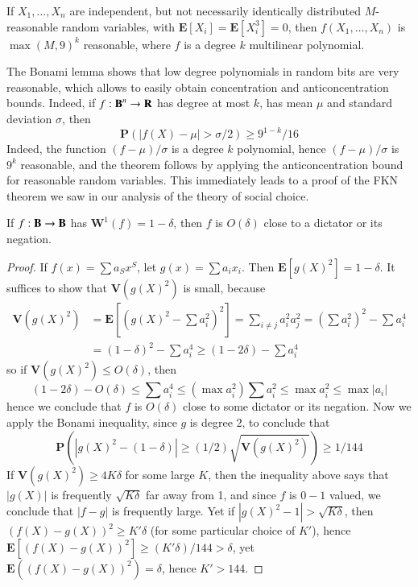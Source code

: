 \begin{corollary}
    If $X_1, \dots, X_n$ are independent, but not necessarily identically distributed $M$-reasonable random variables, with $\mathbf{E}[X_i] = \mathbf{E}[X_i^3] = 0$, then $f(X_1, \dots, X_n)$ is $\max(M,9)^k$ reasonable, where $f$ is a degree $k$ multilinear polynomial.
\end{corollary}

The Bonami lemma shows that low degree polynomials in random bits are very reasonable, which allows to easily obtain concentration and anticoncentration bounds. Indeed, if $f: \operatorname{\mathbf{B}}^n \to \mathbf{R}$ has degree at most $k$, has mean $\mu$ and standard deviation $\sigma$, then
%
\[ \mathbf{P}(|f(X) - \mu| > \sigma/2) \geq 9^{1-k}/16 \]
%
Indeed, the function $(f - \mu)/\sigma$ is a degree $k$ polynomial, hence $(f - \mu)/\sigma$ is $9^k$ reasonable, and the theorem follows by applying the anticoncentration bound for reasonable random variables. This immediately leads to a proof of the FKN theorem we saw in our analysis of the theory of social choice.

\begin{theorem}
    If $f: \operatorname{\mathbf{B}} \to \operatorname{\mathbf{B}}$ has $\mathbf{W}^1(f) = 1 - \delta$, then $f$ is $O(\delta)$ close to a dictator or its negation.
\end{theorem}
\begin{proof}
    If $f(x) = \sum a_S x^S$, let $g(x) = \sum a_i x_i$. Then $\mathbf{E}[g(X)^2] = 1 - \delta$. It suffices to show that $\mathbf{V}(g(X)^2)$ is small, because
    \begin{align*}
        \mathbf{V}(g(X)^2) &= \mathbf{E} \left[ \left(g(X)^2 - \sum a_i^2 \right)^2 \right] = \sum_{i \neq j} a_i^2 a_j^2 = \left( \sum a_i^2 \right)^2 - \sum a_i^4\\
        &= (1 - \delta)^2 - \sum a_i^4 \geq (1 - 2\delta) - \sum a_i^4
    \end{align*}
    so if $\mathbf{V}(g(X)^2) \leq O(\delta)$, then
    \[ (1 - 2\delta) - O(\delta) \leq \sum a_i^4 \leq \left( \max a_i^2 \right) \sum a_i^2 \leq \max a_i^2 \leq \max |a_i| \]
    hence we conclude that $f$ is $O(\delta)$ close to some dictator or its negation. Now we apply the Bonami inequality, since $g$ is degree 2, to conclude that
    \[ \mathbf{P} \left( |g(X)^2 - (1 - \delta)| \geq (1/2) \sqrt{\mathbf{V}(g(X)^2)} \right) \geq 1/144 \]
    If $\mathbf{V}(g(X)^2) \geq 4K \delta$ for some large $K$, then the inequality above says that $|g(X)|$ is frequently $\sqrt{K \delta}$ far away from 1, and since $f$ is $0-1$ valued, we conclude that $|f - g|$ is frequently large. Yet if $|g(X)^2 - 1| > \sqrt{K\delta}$, then $(f(X) - g(X))^2 \geq K' \delta$ (for some particular choice of $K'$), hence $\mathbf{E}[(f(X) - g(X))^2] \geq (K' \delta)/144 > \delta$, yet $\mathbf{E}((f(X) - g(X))^2) = \delta$, hence $K' > 144$.
\end{proof}

